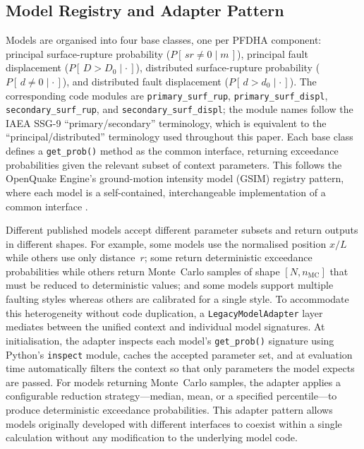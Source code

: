 \subsection{Model Registry and Adapter Pattern}
\label{sec:architecture:adapter}

Models are organised into four base classes, one per PFDHA component: principal surface-rupture probability ($P[\,sr \neq 0 \mid m\,]$), principal fault displacement ($P[\,D > D_0 \mid \cdot\,]$), distributed surface-rupture probability ($P[\,d \neq 0 \mid \cdot\,]$), and distributed fault displacement ($P[\,d > d_0 \mid \cdot\,]$). The corresponding code modules are \texttt{primary\_surf\_rup}, \texttt{primary\_surf\_displ}, \texttt{secondary\_surf\_rup}, and \texttt{secondary\_surf\_displ}; the module names follow the IAEA SSG-9 ``primary/secondary'' terminology, which is equivalent to the ``principal/distributed'' terminology used throughout this paper. Each base class defines a \texttt{get\_prob()} method as the common interface, returning exceedance probabilities given the relevant subset of context parameters. This follows the OpenQuake Engine's ground-motion intensity model (GSIM) registry pattern, where each model is a self-contained, interchangeable implementation of a common interface \citep{Pagani2014}.

Different published models accept different parameter subsets and return outputs in different shapes. For example, some models use the normalised position $x/L$ while others use only distance~$r$; some return deterministic exceedance probabilities while others return Monte~Carlo samples of shape $[N, n_{\mathrm{MC}}]$ that must be reduced to deterministic values; and some models support multiple faulting styles whereas others are calibrated for a single style. To accommodate this heterogeneity without code duplication, a \texttt{LegacyModelAdapter} layer mediates between the unified context and individual model signatures. At initialisation, the adapter inspects each model's \texttt{get\_prob()} signature using Python's \texttt{inspect} module, caches the accepted parameter set, and at evaluation time automatically filters the context so that only parameters the model expects are passed. For models returning Monte~Carlo samples, the adapter applies a configurable reduction strategy---median, mean, or a specified percentile---to produce deterministic exceedance probabilities. This adapter pattern allows models originally developed with different interfaces to coexist within a single calculation without any modification to the underlying model code.


